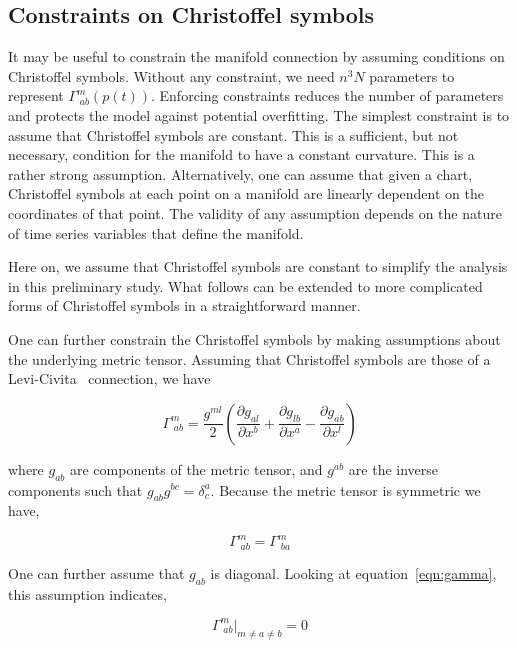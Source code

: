 \documentclass[a4paper,11pt]{elsarticle}
\begin{document}
\subsection{Constraints on Christoffel symbols}
\label{subsection:chrostoffel-constraints}

It may be useful to constrain the manifold connection by assuming
conditions on Christoffel symbols. Without any constraint, we need
$n^3 N$ parameters to represent $\Gamma^{m}_{\;ab}(p(t))$. Enforcing
constraints reduces the number of parameters and protects the model
against potential overfitting. The simplest constraint is to assume
that Christoffel symbols are constant. This is a sufficient, but not
necessary, condition for the manifold to have a constant
curvature. This is a rather strong assumption. Alternatively, one can
assume that given a chart, Christoffel symbols at each point on a
manifold are linearly dependent on the coordinates of that point. The
validity of any assumption depends on the nature of time series
variables that define the manifold.

Here on, we assume that Christoffel symbols are constant to simplify
the analysis in this preliminary study. What follows can be extended
to more complicated forms of Christoffel symbols in a straightforward
manner.

One can further constrain the Christoffel symbols by making assumptions
about the underlying metric tensor. Assuming that Christoffel symbols
are those of a Levi-Civita~\cite{deFelice-1990} connection, we have

\begin{equation}\label{eqn:gamma}
\Gamma^{m}_{\;ab} = \frac{g^{ml}}{2} ( \frac{\partial g_{al}}{\partial
  x^{b}} + \frac{\partial g_{lb}}{\partial x^{a}} - \frac{\partial
  g_{ab}}{\partial x^{l}} )
\end{equation}

where $g_{ab}$ are components of the metric tensor, and $g^{ab}$ are
the inverse components such that $g_{ab} g^{bc} =
\delta^{a}_{c}$. Because the metric tensor is symmetric we have,

\begin{equation}\label{eqn:gamma-symmetry}
\Gamma^{m}_{\;ab} = \Gamma^{m}_{\;ba}
\end{equation}

One can further assume that $g_{ab}$ is diagonal. Looking at
equation~\ref{eqn:gamma}, this assumption indicates,

\begin{equation}\label{eqn:gamma-diagonal-metric}
\Gamma^{m}_{\;ab}|_{m \ne a \ne b} = 0
\end{equation}
\end{document}
